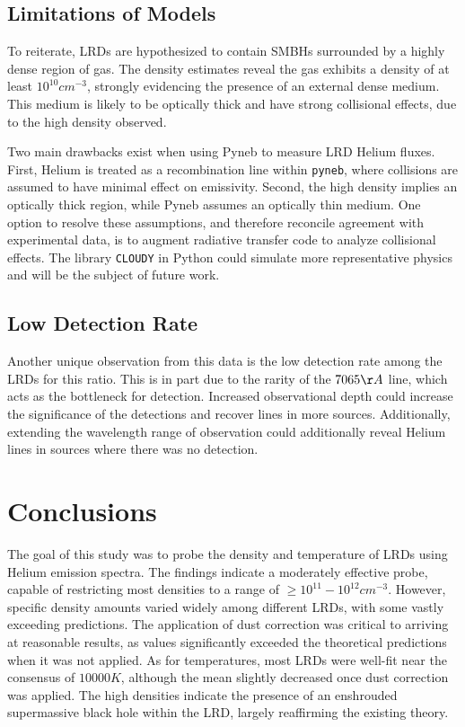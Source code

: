 \documentclass[letterpaper]{aastex701}
\begin{document}
\subsection{Limitations of Models}
To reiterate, LRDs are hypothesized to contain SMBHs surrounded by a highly dense region of gas. The density estimates reveal the gas exhibits a density of at least $10^{10} cm^{-3}$, strongly evidencing the presence of an external dense medium. This medium is likely to be optically thick and have strong collisional effects, due to the high density observed.

Two main drawbacks exist when using Pyneb to measure LRD Helium fluxes. First, Helium is treated as a recombination line within \texttt{pyneb}, where collisions are assumed to have minimal effect on emissivity. Second, the high density implies an optically thick region, while Pyneb assumes an optically thin medium. One option to resolve these assumptions, and therefore reconcile agreement with experimental data, is to augment radiative transfer code to analyze collisional effects. The library \texttt{CLOUDY} in Python could simulate more representative physics and will be the subject of future work.

\subsection{Low Detection Rate}

Another unique observation from this data is the low detection rate among the LRDs for this ratio. This is in part due to the rarity of the $7065\AA$ line, which acts as the bottleneck for detection. Increased observational depth could increase the significance of the detections and recover lines in more sources. Additionally, extending the wavelength range of observation could additionally reveal Helium lines in sources where there was no detection.

\section{Conclusions}

The goal of this study was to probe the density and temperature of LRDs using Helium emission spectra. The findings indicate a moderately effective probe, capable of restricting most densities to a range of $\geq 10^{11}-10^{12} cm^{-3}$. However, specific density amounts varied widely among different LRDs, with some vastly exceeding predictions. The application of dust correction was critical to arriving at reasonable results, as values significantly exceeded the theoretical predictions when it was not applied. As for temperatures, most LRDs were well-fit near the consensus of $10000 K$, although the mean slightly decreased once dust correction was applied. The high densities indicate the presence of an enshrouded supermassive black hole within the LRD, largely reaffirming the existing theory. 
\end{document}
